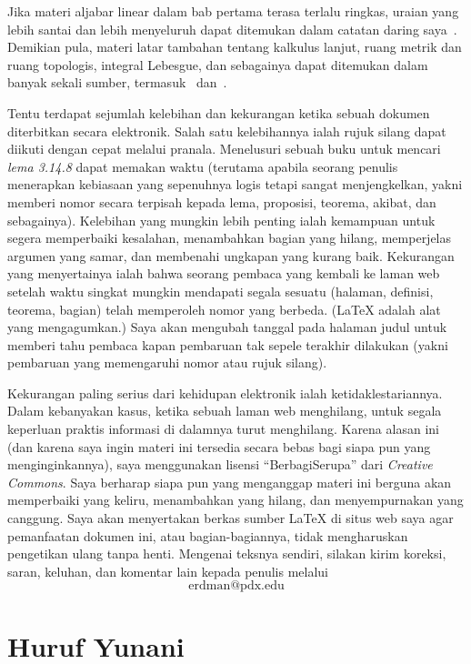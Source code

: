 Jika materi aljabar linear dalam bab pertama terasa terlalu ringkas, uraian yang lebih
santai dan lebih menyeluruh dapat ditemukan dalam catatan daring saya~\cite{Erdman:2010}.
Demikian pula, materi latar tambahan tentang kalkulus lanjut, ruang metrik dan ruang
topologis, integral Lebesgue, dan sebagainya dapat ditemukan dalam banyak sekali sumber,
termasuk~\cite{Erdman:2005} dan~\cite{Erdman:2007}.

Tentu terdapat sejumlah kelebihan dan kekurangan ketika sebuah dokumen diterbitkan secara
elektronik. Salah satu kelebihannya ialah rujuk silang dapat diikuti dengan cepat melalui
pranala. Menelusuri sebuah buku untuk mencari \emph{lema 3.14.8} dapat memakan waktu
(terutama apabila seorang penulis menerapkan kebiasaan yang sepenuhnya logis tetapi
sangat menjengkelkan, yakni memberi nomor secara terpisah kepada lema, proposisi, teorema,
akibat, dan sebagainya). Kelebihan yang mungkin lebih penting ialah kemampuan untuk
segera memperbaiki kesalahan, menambahkan bagian yang hilang, memperjelas argumen yang
samar, dan membenahi ungkapan yang kurang baik. Kekurangan yang menyertainya ialah bahwa
seorang pembaca yang kembali ke laman web setelah waktu singkat mungkin mendapati segala
sesuatu (halaman, definisi, teorema, bagian) telah memperoleh nomor yang berbeda.
({\LaTeX} adalah alat yang mengagumkan.) Saya akan mengubah tanggal pada halaman judul
untuk memberi tahu pembaca kapan pembaruan tak sepele terakhir dilakukan (yakni pembaruan
yang memengaruhi nomor atau rujuk silang).

Kekurangan paling serius dari kehidupan elektronik ialah ketidaklestariannya. Dalam
kebanyakan kasus, ketika sebuah laman web menghilang, untuk segala keperluan praktis
informasi di dalamnya turut menghilang. Karena alasan ini (dan karena saya ingin materi
ini tersedia secara bebas bagi siapa pun yang menginginkannya), saya menggunakan lisensi
``BerbagiSerupa'' dari \emph{Creative Commons}. %
Saya berharap siapa pun yang menganggap
materi ini berguna akan memperbaiki yang keliru, menambahkan yang hilang, dan menyempurnakan
yang canggung. Saya akan menyertakan berkas sumber {\LaTeX} di situs web saya agar
pemanfaatan dokumen ini, atau bagian-bagiannya, tidak mengharuskan pengetikan ulang tanpa
henti. Mengenai teksnya sendiri, silakan kirim koreksi, saran, keluhan, dan komentar lain
kepada penulis melalui
   \[ \textrm{erdman@pdx.edu} \]


\vfill\eject


\section*{Huruf Yunani}

